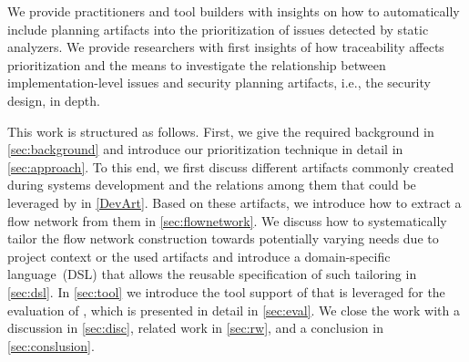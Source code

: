\noindent
	We provide practitioners and tool builders with insights on how to automatically include planning artifacts into the prioritization of issues detected by static analyzers.
	We provide researchers with first insights of how traceability affects prioritization and the means to investigate the relationship between implementation-level issues and security planning artifacts, i.e., the security design, in depth.

This work is structured as follows.
First, we give the required background in \autoref{sec:background} and introduce our prioritization technique in detail in \autoref{sec:approach}.
To this end, we first discuss different artifacts commonly created during systems development and the relations among them that could be leveraged by \appr{} in \autoref{DevArt}.
Based on these artifacts, we introduce how to extract a flow network from them in \autoref{sec:flownetwork}. We discuss how to systematically tailor the flow network construction towards potentially varying needs due to project context or the used artifacts and introduce a domain-specific language~(DSL) that allows the reusable specification of such tailoring in \autoref{sec:dsl}.
In \autoref{sec:tool} we introduce the tool support of \appr{} that is leveraged for the evaluation of \appr{}, which is presented in detail in \autoref{sec:eval}.
We close the work with a discussion in \autoref{sec:disc},
related work in \autoref{sec:rw}, and a conclusion in \autoref{sec:conslusion}.